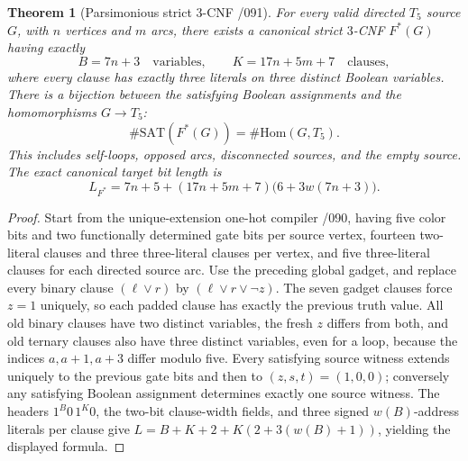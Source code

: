 \documentclass[11pt]{article}
\newtheorem{theorem}{Theorem}
\begin{document}
\begin{theorem}[Parsimonious strict 3-CNF /091]
For every valid directed $T_5$ source $G$, with $n$ vertices and $m$
arcs, there exists a canonical strict $3$-CNF $F^*(G)$ having exactly
\[
 B=7n+3\quad\text{variables},\qquad
 K=17n+5m+7\quad\text{clauses},
\]
where \emph{every clause has exactly three literals on three
distinct Boolean variables}. There is a bijection between the
satisfying Boolean assignments and the homomorphisms $G\to T_5$:
\[
 \boxed{\#\mathrm{SAT}(F^*(G))=\#\mathrm{Hom}(G,T_5).}
\]
This includes self-loops, opposed arcs, disconnected sources, and the
empty source. The exact canonical target bit length is
\[
 \boxed{L_{F^*}=7n+5+
    (17n+5m+7)\bigl(6+3w(7n+3)\bigr).}
\]
\end{theorem}
\begin{proof}
Start from the unique-extension one-hot compiler /090, having five
color bits and two functionally determined gate bits per source vertex,
fourteen two-literal clauses and three three-literal clauses per
vertex, and five three-literal clauses for each directed source arc.
Use the preceding global gadget, and replace every binary clause
$(\ell\lor r)$ by $(\ell\lor r\lor\neg z)$.
The seven gadget clauses force $z=1$ uniquely, so each padded
clause has exactly the previous truth value. All old binary
clauses have two distinct variables, the fresh $z$ differs from both,
and old ternary clauses also have three distinct variables, even
for a loop, because the indices $a,a+1,a+3$ differ modulo five.
Every satisfying source witness extends uniquely to the previous
gate bits and then to $(z,s,t)=(1,0,0)$; conversely any satisfying
Boolean assignment determines exactly one source witness.
The headers $1^B0\,1^K0$, the two-bit clause-width fields, and
three signed $w(B)$-address literals per clause give
$L=B+K+2+K(2+3(w(B)+1))$, yielding the displayed formula.
\end{proof}
\end{document}

